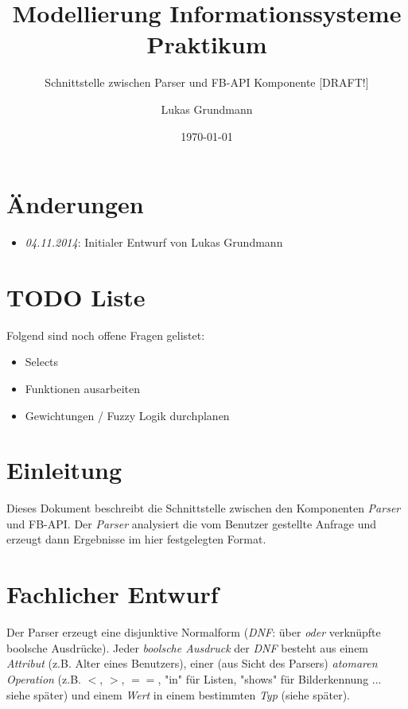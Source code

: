 \documentclass[a4paper,10pt,parskip=half]{scrartcl}
\title{Modellierung Informationssysteme Praktikum}
\subtitle{Schnittstelle zwischen Parser und FB-API Komponente [DRAFT!]}
\author{Lukas Grundmann}
\date{\today}
\begin{document}
\maketitle

\begin{abstract}

\end{abstract}

\section{Änderungen}

\begin{itemize}
 \item \textit{04.11.2014}: Initialer Entwurf von Lukas Grundmann
\end{itemize}

\section{TODO Liste}

Folgend sind noch offene Fragen gelistet:
\begin{itemize}
  \item Selects
  \item Funktionen ausarbeiten
  \item Gewichtungen / Fuzzy Logik durchplanen
\end{itemize}


\section{Einleitung}

Dieses Dokument beschreibt die Schnittstelle zwischen den Komponenten 
\textit{Parser} und {FB-API}. Der \textit{Parser} analysiert die vom Benutzer
gestellte Anfrage und erzeugt dann Ergebnisse im hier festgelegten Format.

\section{Fachlicher Entwurf}

Der Parser erzeugt eine disjunktive Normalform (\textit{DNF}: über 
\textit{oder} verknüpfte boolsche Ausdrücke). Jeder \textit{boolsche Ausdruck} 
der \textit{DNF} besteht aus einem \textit{Attribut} (z.B. Alter eines 
Benutzers), einer (aus Sicht des Parsers) \textit{atomaren Operation} 
(z.B. $<$, $>$, $==$, "in" für Listen, "shows" für Bilderkennung ... siehe 
später) und einem \textit{Wert} in einem bestimmten \textit{Typ} (siehe später).
\end{document}
